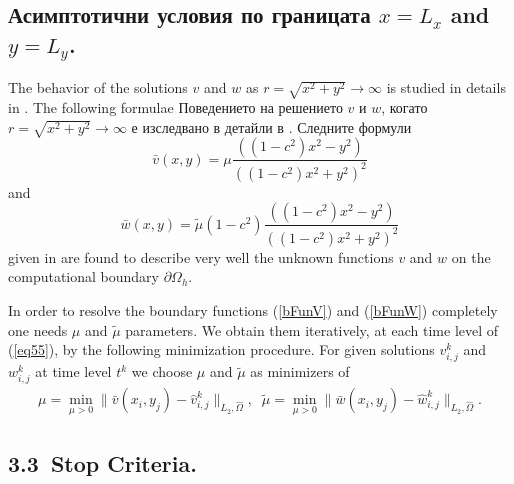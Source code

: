 \documentclass{article}
\newcommand{\rf}[1]{(\ref{#1})}
\newcommand{\dO}{\partial\Omega_{h}}
\begin{document}
\subsection{Асимптотични условия по границата $x=L_x$ and $y=L_y$.}

The behavior of the solutions $v$ and $w$  as $r =\sqrt{x^2 +y^2} \rightarrow \infty$ is studied in details in \cite{Ch2012,Ch2011,bnd}. The following formulae
Поведението на решението $v$ и $w$, когато $r =\sqrt{x^2 +y^2} \rightarrow \infty$ е изследвано в детайли в \cite{Ch2012,Ch2011,bnd}. Следните формули
\begin{equation}\label{bFunV}
\bar{v}(x,y) = \mu \frac{( (1-c^2)x^2-y^2 )}{((1-c^2)x^2 + y^2)^2 }
\end{equation}
and
\begin{equation}\label{bFunW}
\bar{w}(x,y) =\tilde {\mu} (1-c^2) \frac{( (1-c^2)x^2-y^2 )}{((1-c^2)x^2 + y^2)^2 }
\end{equation}
given in \cite{bnd} are found to describe very well the unknown functions $v$ and $w$ on the computational boundary $\dO$. 

In order to resolve the boundary functions \rf{bFunV} and \rf{bFunW} completely one needs $\mu$ and $\tilde {\mu}$ parameters.
We obtain them iteratively, at each time level of \rf{eq55}, by the following minimization procedure. For  given solutions  $v^k_{i,j}$ and $ w^k_{i,j}$ at time level $t^k$ 
we choose $\mu$ and $\tilde {\mu}$ as minimizers of 
\begin{equation}\label{mu}
\begin{split}
\mu = \underset{\mu>0 }{\operatorname{min} } \| \bar{v}(x_i,y_j) - \widehat{v}^k_{i,j} \|_{L_2,\widehat{\Omega}},
\;\;
\tilde {\mu} = \underset{\mu>0 }{\operatorname{min} } \| \bar{w}(x_i,y_j) -\widehat{w}^k_{i,j} \|_{L_2,\widehat{\Omega}}.
\end{split}
\end{equation}
 
\subsection{3.3~Stop Criteria.}
\end{document}
